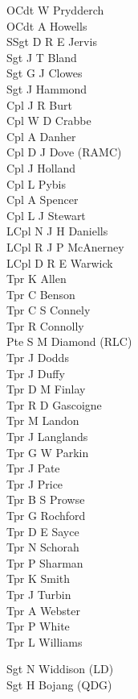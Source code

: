 \begin{multicols}{2}
  \noindent
  OCdt W Prydderch \\
  OCdt A Howells \\
  SSgt D R E Jervis \\
  Sgt J T Bland \\
  Sgt G J Clowes \\
  Sgt J Hammond \\
  Cpl J R Burt \\
  Cpl W D Crabbe \\
  Cpl A Danher \\
  Cpl D J Dove (RAMC) \\
  Cpl J Holland \\
  Cpl L Pybis \\
  Cpl A Spencer \\
  Cpl L J Stewart \\
  LCpl N J H Daniells \\
  LCpl R J P McAnerney \\
  LCpl D R E Warwick \\
  Tpr K Allen \\
  Tpr C Benson \\
  Tpr C S Connely \\
  Tpr R Connolly \\
  Pte S M Diamond (RLC) \\
  Tpr J Dodds \\
  Tpr J Duffy \\
  Tpr D M Finlay \\
  Tpr R D Gascoigne \\
  Tpr M Landon \\
  Tpr J Langlands \\
  Tpr G W Parkin \\
  Tpr J Pate \\
  Tpr J Price \\
  Tpr B S Prowse \\
  Tpr G Rochford \\
  Tpr D E Sayce \\
  Tpr N Schorah \\
  Tpr P Sharman \\
  Tpr K Smith \\
  Tpr J Turbin \\
  Tpr A Webster \\
  Tpr P White \\
  Tpr L Williams \\
\end{multicols}

\begin{multicols}{2}
  \noindent
  Sgt N Widdison (LD) \\
  Sgt H Bojang (QDG) \\
\end{multicols}
